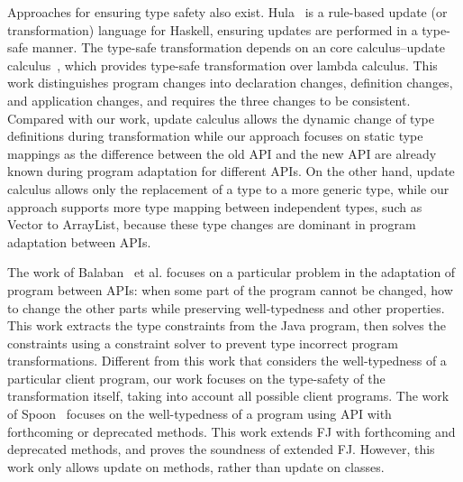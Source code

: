  Approaches for ensuring type
safety also exist. Hula~\cite{hula} is a rule-based update (or transformation) language for
Haskell, ensuring updates are performed in a type-safe manner. The
type-safe transformation depends on an core calculus--update
calculus~\cite{updatecalculus}, which provides type-safe
transformation over lambda calculus. This work distinguishes program
changes into declaration changes, definition changes, and application
changes, and requires the three changes to be consistent. Compared
with our work, update calculus allows the dynamic change of type
definitions during transformation while our approach focuses on static
type mappings as the difference between the old API and the new API
are already known during program adaptation for different APIs. On the
other hand, update calculus allows only the replacement of a type to a
more generic type, while our approach supports more type mapping
between independent types, such as Vector to ArrayList, because these
type changes are dominant in program adaptation between APIs.

The work of Balaban~\cite{oopsla05} et al. focuses on a particular
problem in the adaptation of program between APIs: when some part of
the program cannot be changed, how to change the other parts 
while preserving well-typedness and other properties. This work extracts the
type constraints from the Java program, then solves the constraints
using a constraint solver to prevent type incorrect program
transformations. Different from this work
that considers the well-typedness of a particular client program, our
work focuses on the type-safety of the transformation itself, taking
into account all possible client programs. The work of Spoon~\cite{fool06} 
focuses on the well-typedness of a program using API with forthcoming 
or deprecated methods. This work extends FJ with forthcoming
and deprecated methods, and proves the soundness of extended FJ.
However, this work only allows update on methods, rather than
update on classes.

